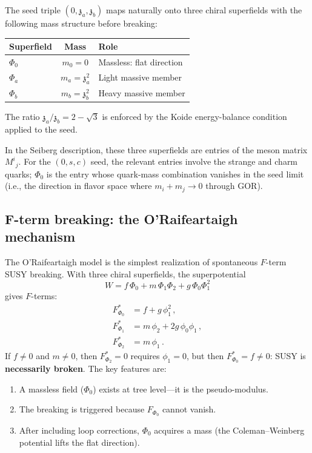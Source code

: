 \documentclass[12pt,a4paper]{article}
\newcommand{\zch}{\mathfrak{z}}
\begin{document}
The seed triple $(0, \zch_a, \zch_b)$ maps naturally onto three 
chiral superfields with the following mass structure before breaking:

\begin{center}
\begin{tabular}{lcl}
\toprule
Superfield & Mass & Role \\
\midrule
$\Phi_0$ & $m_0 = 0$ & Massless: flat direction \\
$\Phi_a$ & $m_a = \zch_a^2$ & Light massive member \\
$\Phi_b$ & $m_b = \zch_b^2$ & Heavy massive member \\
\bottomrule
\end{tabular}
\end{center}

The ratio $\zch_a/\zch_b = 2 - \sqrt{3}$ is enforced by the 
Koide energy-balance condition applied to the seed.

In the Seiberg description, these three superfields are entries of 
the meson matrix $M^i{}_j$. For the $(0, s, c)$ seed, the relevant 
entries involve the strange and charm quarks; $\Phi_0$ is the entry 
whose quark-mass combination vanishes in the seed limit (i.e., the 
direction in flavor space where $m_i + m_j \to 0$ through GOR).

\subsection{F-term breaking: the O'Raifeartaigh mechanism}
\label{subsec:fterm}

The O'Raifeartaigh model \cite{ORaifeartaigh} is the simplest 
realization of spontaneous $F$-term SUSY breaking. With three chiral 
superfields, the superpotential
\begin{equation}
W = f\,\Phi_0 + m\,\Phi_1\Phi_2 + g\,\Phi_0\Phi_1^2
\end{equation}
gives $F$-terms:
\begin{align}
F_{\Phi_0}^* &= f + g\,\phi_1^2\,, \\
F_{\Phi_1}^* &= m\,\phi_2 + 2g\,\phi_0\phi_1\,, \\
F_{\Phi_2}^* &= m\,\phi_1\,.
\end{align}
If $f \neq 0$ and $m \neq 0$, then $F_{\Phi_2}^* = 0$ requires 
$\phi_1 = 0$, but then $F_{\Phi_0}^* = f \neq 0$: SUSY is 
\textbf{necessarily broken}. The key features are:
\begin{enumerate}
\item A massless field ($\Phi_0$) exists at tree level---it is the 
pseudo-modulus.
\item The breaking is triggered because $F_{\Phi_0}$ cannot vanish.
\item After including loop corrections, $\Phi_0$ acquires a mass 
(the Coleman--Weinberg potential lifts the flat direction).
\end{enumerate}
\end{document}
